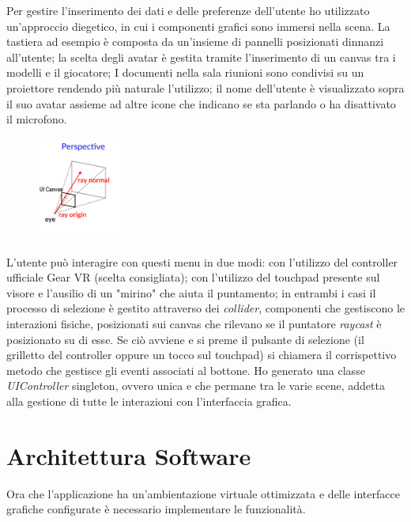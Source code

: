 Per gestire l'inserimento dei dati e delle preferenze dell'utente ho utilizzato un'approccio diegetico, in cui i componenti grafici sono immersi nella scena. La tastiera ad esempio è composta da un'insieme di pannelli posizionati dinnanzi all'utente; la scelta degli avatar è gestita tramite l'inserimento di un canvas tra i modelli e il giocatore; I documenti nella sala riunioni sono condivisi su un proiettore rendendo più naturale l'utilizzo; il nome dell'utente è visualizzato sopra il suo avatar assieme ad altre icone che indicano se sta parlando o ha disattivato il microfono.     

\begin{figure} %
	\centering
	\includegraphics[width=0.25\textwidth]{figure/raycast}
	
\end{figure}

L'utente può interagire con questi menu in due modi: con l'utilizzo del controller ufficiale Gear VR (scelta consigliata); con l'utilizzo del touchpad presente sul visore e l'ausilio di un "mirino" che aiuta il puntamento; in entrambi i casi il processo di selezione è gestito attraverso dei \textit{collider}, componenti che gestiscono le interazioni fisiche, posizionati sui canvas che rilevano se il puntatore \textit{raycast} è posizionato su di esse. Se ciò avviene e si preme il pulsante di selezione (il grilletto del controller oppure un tocco sul touchpad) si chiamera il corrispettivo metodo che gestisce gli eventi associati al bottone. Ho generato una classe \textit{UIController} singleton, ovvero unica e che permane tra le varie scene, addetta alla gestione di tutte le interazioni con l'interfaccia grafica.



\section{Architettura Software}
Ora che l'applicazione ha un'ambientazione virtuale ottimizzata e delle interfacce grafiche configurate è necessario implementare le funzionalità.
